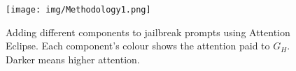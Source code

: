  

\begin{figure}[ht]
    \centering
    \texttt{[image: img/Methodology1.png]}
    \caption{Adding different components to jailbreak prompts using Attention Eclipse. Each component's colour shows the attention paid to $G_H$. Darker means higher attention.}
    \label{fig: Attention Pattern}
\end{figure}








